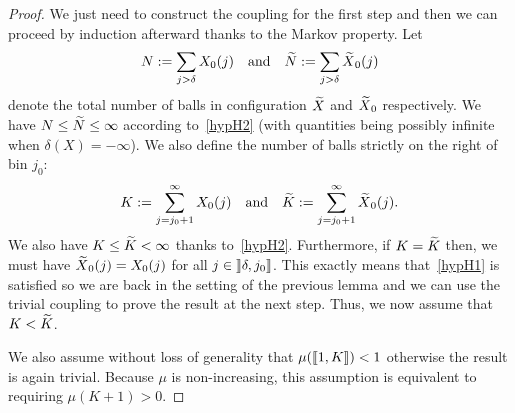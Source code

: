 \documentclass[AHL,Unicode,longabstracts,published]{cedram}
\let\oldin\in
\renewcommand{\in}{\mathchoice{\oldin}{\oldin}{\,\oldin\,}{\,\oldin\,}}
\let\oldtilde\tilde
\renewcommand*{\tilde}[1]{\mathchoice{\widetilde{#1}}{\widetilde{#1}}{\oldtilde{#1}}{\oldtilde{#1}}}
\newcommand{\llbracket}{\mathopen{[\mkern -2.7mu[}}
\newcommand{\rrbracket}{\mathclose{]\mkern -2.7mu]}}
\newcommand{\rrbracketopen}{\mathopen{]\mkern -2.7mu]}}
\newcommand{\llb}{\llbracket}
\newcommand{\rrb}{\rrbracket}
\begin{document}
\begin{proof}
We just need to construct the coupling for the first step and then we can proceed by induction afterward thanks to the Markov property. Let
\[
N
:= \sum_{j > \delta} X_0(j) \quad\text{and} \quad \tilde{N}
:= \sum_{j > \delta} \tilde{X}_0(j)
\]
denote the total number of balls in configuration $\tilde{X}$ and $\tilde{X}_0$ respectively. We have $N\leq \tilde{N}\leq\infty$ according to~\eqref{hypH2} (with quantities being possibly infinite when $\delta(X) =-\infty$). We also define the number of balls strictly on the right of bin $j_0$:
\[
K
:= \sum_{j = j_0 + 1}^\infty X_0(j) \quad \text{and} \quad \tilde{K}
:= \sum_{j = j_0 + 1}^\infty \tilde{X}_0(j).
\]
We also have $K \leq \tilde{K} < \infty$ thanks to~\eqref{hypH2}. Furthermore, if $K = \tilde{K}$ then, we must have $\tilde{X}_0(j) = X_0(j)$ for all $j\in \rrbracketopen \delta, j_0\rrb$. This exactly means that~\eqref{hypH1} is satisfied so we are back in the setting of the previous lemma and we can use the trivial coupling to prove the result at the next step. Thus, we now assume that $K < \tilde{K}$.

We also assume without loss of generality that $\mu(\llb 1, K\rrb) < 1$ otherwise the result is again trivial. Because $\mu$ is non-increasing, this assumption is equivalent to requiring $\mu(K+1) > 0$.


\end{proof}
\end{document}
